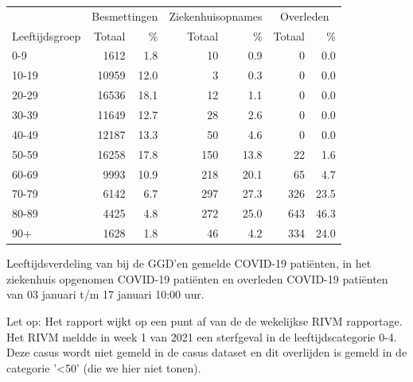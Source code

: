 \documentclass[
  english,
  man,floatsintext]{apa6}
\begin{document}
\begin{table}[H]
\centering\begingroup\fontsize{11}{13}\selectfont

\begin{threeparttable}
\begin{tabular}{lrrrrrr}
\toprule
\multicolumn{1}{c}{ } & \multicolumn{2}{c}{Besmettingen} & \multicolumn{2}{c}{Ziekenhuisopnames} & \multicolumn{2}{c}{Overleden} \\
\cmidrule(l{3pt}r{3pt}){2-3} \cmidrule(l{3pt}r{3pt}){4-5} \cmidrule(l{3pt}r{3pt}){6-7}
Leeftijdsgroep & Totaal & \% & Totaal & \% & Totaal & \%\\
\midrule
0-9 & 1612 & 1.8 & 10 & 0.9 & 0 & 0.0\\
10-19 & 10959 & 12.0 & 3 & 0.3 & 0 & 0.0\\
20-29 & 16536 & 18.1 & 12 & 1.1 & 0 & 0.0\\
30-39 & 11649 & 12.7 & 28 & 2.6 & 0 & 0.0\\
40-49 & 12187 & 13.3 & 50 & 4.6 & 0 & 0.0\\
50-59 & 16258 & 17.8 & 150 & 13.8 & 22 & 1.6\\
60-69 & 9993 & 10.9 & 218 & 20.1 & 65 & 4.7\\
70-79 & 6142 & 6.7 & 297 & 27.3 & 326 & 23.5\\
80-89 & 4425 & 4.8 & 272 & 25.0 & 643 & 46.3\\
90+ & 1628 & 1.8 & 46 & 4.2 & 334 & 24.0\\
\bottomrule
\end{tabular}
\begin{tablenotes}
\item[1] Leeftijdsverdeling van bij de GGD’en gemelde COVID-19 patiënten, in het ziekenhuis opgenomen COVID-19 patiënten en overleden COVID-19 patiënten van 03 januari t/m 17 januari 10:00 uur.
\item[2] Let op: Het rapport wijkt op een punt af van de de wekelijkse RIVM rapportage. Het RIVM meldde in week 1 van 2021 een sterfgeval in de leeftijdscategorie 0-4. Deze casus wordt niet gemeld in de casus dataset en dit overlijden is gemeld in de categorie '<50' (die we hier niet tonen).
\end{tablenotes}
\end{threeparttable}
\endgroup{}
\end{table}

\newpage
\end{document}
